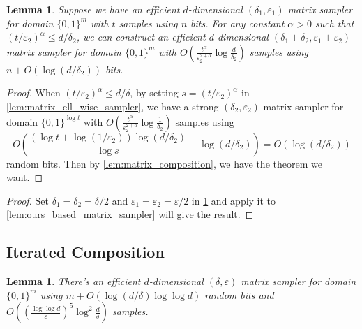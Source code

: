 \documentclass[10pt,a4paper]{article}
\newtheorem{lemma}[theorem]{Lemma}
\newcommand{\eps}{\varepsilon}
\newcommand{\1}{\mathbbm{1}}
\newcommand{\zo}{\{0, 1\}}
\begin{document}
\begin{lemma}
    \label{lem:matrix_sample_size_reduction}
    Suppose we have an efficient $d$-dimensional $(\delta_1, \eps_1)$ matrix sampler for domain $\zo^m$ with $t$ samples using $n$ bits. For any constant $\alpha > 0$ such that $(t / \eps_2)^\alpha \le d / \delta_2$, we can construct an efficient $d$-dimensional $(\delta_1 + \delta_2, \eps_1 + \eps_2)$ matrix sampler for domain $\zo^m$ with $O(\frac{t^\alpha}{\eps_2^{2+\alpha}} \log \frac{d}{\delta_2} )$ samples using $n + O(\log (d / \delta_2))$ bits.
\end{lemma}
\begin{proof}
    When $(t / \eps_2)^\alpha \le d / \delta$, by setting $s = (t / \eps_2)^\alpha$ in \cref{lem:matrix_ell_wise_sampler}, we have a strong $(\delta_2, \eps_2)$ matrix sampler for domain $\zo^{\log t}$ with $O(\frac{{t}^\alpha}{\eps_2^{2+\alpha}}\log \frac{1}{\delta_2})$ samples using 
    \[
        O\left(\frac{(\log t + \log(1/\eps_2)) \log (d / \delta_2)}{\log s} + \log (d / \delta_2)\right) = O(\log (d / \delta_2))
    \]
    random bits. Then by \cref{lem:matrix_composition}, we have the theorem we want.
\end{proof}

\polydSampler*
\begin{proof}
    Set $\delta_1 = \delta_2 = \delta / 2$ and $\eps_1 = \eps_2 = \eps / 2$ in  \cref{lem:matrix_sample_size_reduction} and apply it to \cref{lem:ours_based_matrix_sampler} will give the result.
\end{proof}

\subsection{Iterated Composition}


















\begin{lemma}
    \label{lem:induction_lemma}
    There's an efficient $d$-dimensional $(\delta, \eps)$ matrix sampler for domain $\zo^m$ using $m + O(\log(d / \delta) \log\log d)$ random bits and $O((\frac{\log\log d}{\eps})^5\log^{2}\frac{d}{\delta})$ samples.
\end{lemma}
\end{document}
